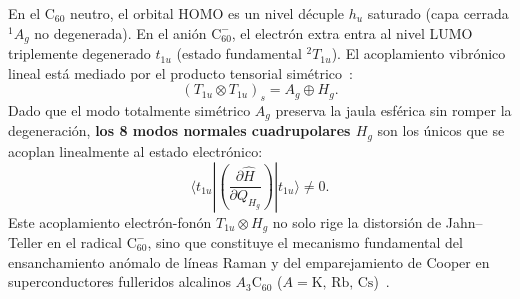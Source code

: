 En el $\text{C}_{60}$ neutro, el orbital HOMO es un nivel décuple $h_u$ saturado (capa cerrada $^1A_g$ no degenerada). En el anión $\text{C}_{60}^-$, el electrón extra entra al nivel LUMO triplemente degenerado $t_{1u}$ (estado fundamental $^2T_{1u}$). El acoplamiento vibrónico lineal está mediado por el producto tensorial simétrico~\cite{JahnTeller1937, Ramadevi2019}:
\begin{equation}
(T_{1u} \otimes T_{1u})_s = A_g \oplus H_g.
\end{equation}
Dado que el modo totalmente simétrico $A_g$ preserva la jaula esférica sin romper la degeneración, \textbf{los 8 modos normales cuadrupolares $H_g$} son los únicos que se acoplan linealmente al estado electrónico:
\begin{equation}
\langle t_{1u} | \left( \frac{\partial \hat{H}}{\partial Q_{H_g}} \right) | t_{1u} \rangle \neq 0.
\end{equation}
Este acoplamiento electrón-fonón $T_{1u} \otimes H_g$ no solo rige la distorsión de Jahn--Teller en el radical $\text{C}_{60}^-$, sino que constituye el mecanismo fundamental del ensanchamiento anómalo de líneas Raman y del emparejamiento de Cooper en superconductores fulleridos alcalinos $A_3\text{C}_{60}$ ($A = \text{K, Rb, Cs}$)~\cite{Kuzmany1994}.
